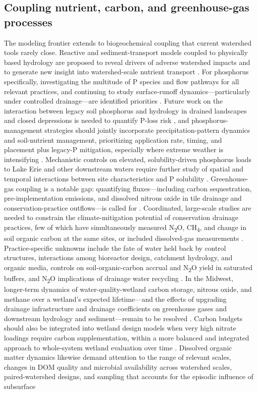\subsection{Coupling nutrient, carbon, and greenhouse-gas processes}

The modeling frontier extends to biogeochemical coupling that current watershed tools rarely close. Reactive and sediment-transport models coupled to physically based hydrology are proposed to reveal drivers of adverse watershed impacts and to generate new insight into watershed-scale nutrient transport \parencite{Rathore2025}. For phosphorus specifically, investigating the multitude of P species and flow pathways for all relevant practices, and continuing to study surface-runoff dynamics---particularly under controlled drainage---are identified priorities \parencite{Mitchell2023}. Future work on the interaction between legacy soil phosphorus and hydrology in drained landscapes and closed depressions is needed to quantify P-loss risk \parencite{Mumbi2024}, and phosphorus-management strategies should jointly incorporate precipitation-pattern dynamics and soil-nutrient management, prioritizing application rate, timing, and placement plus legacy-P mitigation, especially where extreme weather is intensifying \parencite{Mumbi2025b}. Mechanistic controls on elevated, solubility-driven phosphorus loads to Lake Erie and other downstream waters require further study of spatial and temporal interactions between site characteristics and P solubility \parencite{Hanrahan2020}. Greenhouse-gas coupling is a notable gap: quantifying fluxes---including carbon sequestration, pre-implementation emissions, and dissolved nitrous oxide in tile drainage and conservation-practice outflows---is called for \parencite{Mitchell2023}. Coordinated, large-scale studies are needed to constrain the climate-mitigation potential of conservation drainage practices, few of which have simultaneously measured N\textsubscript{2}O, CH\textsubscript{4}, and change in soil organic carbon at the same sites, or included dissolved-gas measurements \parencite{Hall2025}. Practice-specific unknowns include the fate of water held back by control structures, interactions among bioreactor design, catchment hydrology, and organic media, controls on soil-organic-carbon accrual and N\textsubscript{2}O yield in saturated buffers, and N\textsubscript{2}O implications of drainage water recycling \parencite{Hall2025}. In the Midwest, longer-term dynamics of water-quality-wetland carbon storage, nitrous oxide, and methane over a wetland's expected lifetime---and the effects of upgrading drainage infrastructure and drainage coefficients on greenhouse gases and downstream hydrology and sediment---remain to be resolved \parencite{Mitchell2022}. Carbon budgets should also be integrated into wetland design models when very high nitrate loadings require carbon supplementation, within a more balanced and integrated approach to whole-system wetland evaluation over time \parencite{Kadlec2012}. Dissolved organic matter dynamics likewise demand attention to the range of relevant scales, changes in DOM quality and microbial availability across watershed scales, paired-watershed designs, and sampling that accounts for the episodic influence of subsurface 